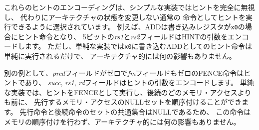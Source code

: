 \begin{commentary}
\begin{comment}
These HINT encodings have been chosen so that simple implementations can ignore
HINTs altogether, and instead execute a HINT as a regular
instruction that happens not to mutate the architectural state.  For example, ADD is
a HINT if the destination register is {\tt x0}; the five-bit {\em rs1} and {\em
rs2} fields encode arguments to the HINT.  However, a simple implementation can
simply execute the HINT as an ADD of {\em rs1} and {\em rs2} that writes {\tt
x0}, which has no architecturally visible effect.
\end{comment}

これらのヒントのエンコーディングは、シンプルな実装ではヒントを完全に無視し、
代わりにアーキテクチャの状態を変更しない通常の
命令としてヒントを実行できるように選択されています。
例えば、ADDは書き込みレジスタが{\tt x0}の場合にヒント命令となり、
5ビットの{\em rs1}と{\em rs2}フィールドはHINTの引数をエンコードします。
ただし、単純な実装では{\tt x0}に書き込むADDとしてのヒント命令は単純に実行されるだけで、
アーキテクチャ的には何の影響もありません。

\begin{comment}
As another example, a FENCE instruction with a zero {\em pred} field and
a zero {\em fm} field is a HINT; the {\em succ}, {\em rs1}, and {\em rd}
fields encode the arguments to the HINT.
A simple implementation can simply execute the HINT as a FENCE that orders the
null set of prior memory accesses before whichever subsequent memory accesses
are encoded in the {\em succ} field.
Since the intersection of the predecessor and successor sets is null, the
instruction imposes no memory orderings, and so it has no architecturally
visible effect.
\end{comment}

別の例として、{\em pred}フィールドがゼロで{\em fm}フィールドもゼロのFENCE命令はヒントであり、
{\em succ}, {\em rs1}, {\em rd}フィールドはヒントの引数をエンコードします。
単純な実装では、ヒントをFENCEとして実行し、後続のどのメモリ・アクセスよりも前に、
先行するメモリ・アクセスのNULLセットを順序付けることができます。
先行命令と後続命令のセットの共通集合はNULLであるため、
この命令はメモリの順序付けを行わず、アーキテクチャ的には何の影響もありません。
\end{commentary}

\begin{comment}
Table~\ref{tab:rv32i-hints} lists all RV32I HINT code points.  91\% of the HINT
space is reserved for standard HINTs.  The
remainder of the HINT space is designated for custom HINTs: no standard HINTs
will ever be defined in this subspace.
\end{comment}

